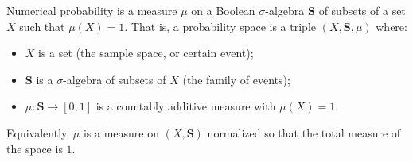 Numerical probability is a measure $\mu$ on a Boolean $\sigma$-algebra $\mathbf{S}$ of subsets of a set $X$ such that $\mu(X) = 1$. That is, a probability space is a triple $(X, \mathbf{S}, \mu)$ where:
\begin{itemize}
\item $X$ is a set (the sample space, or certain event);
\item $\mathbf{S}$ is a $\sigma$-algebra of subsets of $X$ (the family of events);
\item $\mu: \mathbf{S} \to [0,1]$ is a countably additive measure with $\mu(X) = 1$.
\end{itemize}
Equivalently, $\mu$ is a measure on $(X, \mathbf{S})$ normalized so that the total measure of the space is $1$.
